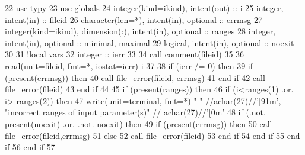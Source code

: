 \begin{DoxyCode}
22       \textcolor{keywordtype}{use }typy
23       \textcolor{keywordtype}{use }globals
24       \textcolor{keywordtype}{integer(kind=ikind)}, \textcolor{keywordtype}{intent(out)} :: i
25       \textcolor{keywordtype}{integer}, \textcolor{keywordtype}{intent(in)} :: fileid
26       \textcolor{keywordtype}{character(len=*)}, \textcolor{keywordtype}{intent(in)}, \textcolor{keywordtype}{optional} :: errmsg
27       \textcolor{keywordtype}{integer(kind=ikind)}, \textcolor{keywordtype}{dimension(:)}, \textcolor{keywordtype}{intent(in)},  \textcolor{keywordtype}{optional} :: ranges
28       \textcolor{keywordtype}{integer}, \textcolor{keywordtype}{intent(in)}, \textcolor{keywordtype}{optional} :: minimal, maximal
29       \textcolor{keywordtype}{logical}, \textcolor{keywordtype}{intent(in)}, \textcolor{keywordtype}{optional} :: noexit
30 
31       \textcolor{comment}{!local vars}
32       \textcolor{keywordtype}{integer} :: ierr
33 
34       \textcolor{keyword}{call }comment(fileid)
35 
36       \textcolor{keyword}{read}(unit=fileid, fmt=*, iostat=ierr) i
37 
38       \textcolor{keywordflow}{if} (ierr /= 0) \textcolor{keywordflow}{then}
39         \textcolor{keywordflow}{if} (\textcolor{keyword}{present}(errmsg)) \textcolor{keywordflow}{then}
40           \textcolor{keyword}{call }file_error(fileid, errmsg)
41 \textcolor{keywordflow}{        end if}
42         \textcolor{keyword}{call }file_error(fileid)
43 \textcolor{keywordflow}{      end if}
44 
45       \textcolor{keywordflow}{if} (\textcolor{keyword}{present}(ranges)) \textcolor{keywordflow}{then}
46         \textcolor{keywordflow}{if} (i<ranges(1) .or. i> ranges(2)) \textcolor{keywordflow}{then}
47           \textcolor{keyword}{write}(unit=terminal, fmt=*) \textcolor{stringliteral}{" "} //achar(27)//\textcolor{stringliteral}{'[91m'}, \textcolor{stringliteral}{"incorrect ranges of input parameter(s)"}\textcolor{comment}{ //
      achar(27)//}\textcolor{stringliteral}{'[0m'}
48           \textcolor{keywordflow}{if} (.not. \textcolor{keyword}{present}(noexit) .or. .not. noexit) \textcolor{keywordflow}{then}
49             \textcolor{keywordflow}{if} (\textcolor{keyword}{present}(errmsg)) \textcolor{keywordflow}{then}
50               \textcolor{keyword}{call }file_error(fileid,errmsg)
51             \textcolor{keywordflow}{else}
52               \textcolor{keyword}{call }file_error(fileid)
53 \textcolor{keywordflow}{            end if}
54 \textcolor{keywordflow}{          end if}
55 \textcolor{keywordflow}{        end if}
56 \textcolor{keywordflow}{      end if}
57 
\end{DoxyCode}
